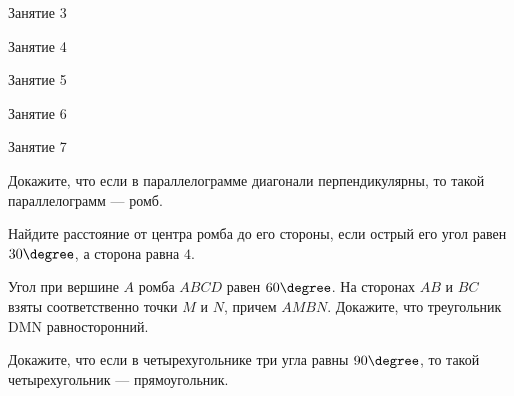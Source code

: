 \begin{class}[number=3]
	\begin{listofex}
		\item Занятие 3
	\end{listofex}
\end{class}

\begin{class}[number=4]
	\begin{listofex}
		\item Занятие 4
	\end{listofex}
\end{class}

\begin{class}[number=5]
	\begin{listofex}
		\item Занятие 5
	\end{listofex}
\end{class}

\begin{class}[number=6]
	\begin{listofex}
		\item Занятие 6
	\end{listofex}
\end{class}

\begin{class}[number=7]
	\begin{listofex}
		\item Занятие 7
	\end{listofex}
\end{class}

\begin{homework}[number=1]
	\begin{listofex}
		\item Докажите, что если в параллелограмме диагонали перпендикулярны, то такой параллелограмм --- ромб.
		\item Найдите расстояние от центра ромба до его стороны, если острый его угол равен \( 30\degree \), а сторона равна \( 4 \).
		\item Угол при вершине \( A \) ромба \( ABCD \) равен \( 60\degree \). На сторонах \( AB \) и \( BC \) взяты соответственно точки \( M \) и \( N \), причем \( AMBN \). Докажите, что треугольник DMN равносторонний.
		\item Докажите, что если в четырехугольнике три угла равны \( 90\degree \), то такой четырехугольник --- прямоугольник.
		\item {}
	\end{listofex}
\end{homework}

